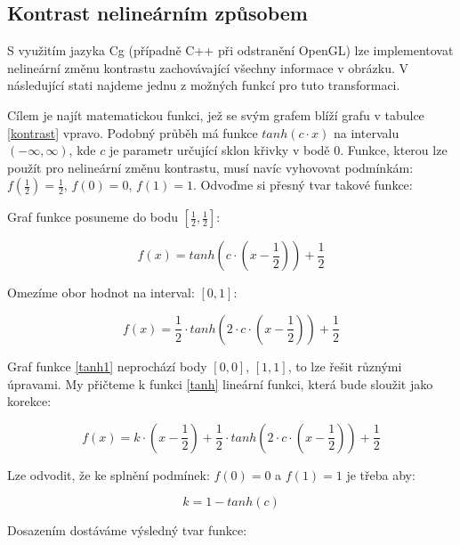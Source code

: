\subsection{Kontrast nelineárním způsobem}
S využitím jazyka Cg (případně C++ při odstranění OpenGL) lze implementovat nelineární změnu kontrastu zachovávající všechny informace v obrázku. V následující stati najdeme jednu z možných funkcí pro tuto transformaci.

Cílem je najít matematickou funkci, jež se svým grafem blíží grafu v tabulce \ref{kontrast} vpravo. Podobný průběh má funkce $tanh(c\cdot x)$ na intervalu $(-\infty,\infty)$, kde $c$ je parametr určující sklon křivky v bodě $0$. Funkce, kterou lze použít pro nelineární změnu kontrastu, musí navíc vyhovovat podmínkám: $f(\frac{1}{2})=\frac{1}{2}$, $f(0)=0$, $f(1)=1$. Odvoďme si přesný tvar takové funkce:

Graf funkce posuneme do bodu  $[\frac{1}{2},\frac{1}{2}]$:

\begin{equation}
f(x) = tanh(c\cdot(x-\frac{1}{2})) + \frac{1}{2}
\end{equation}

Omezíme obor hodnot na interval: $[0,1]$:

\begin{equation} \label{tanh1}
f(x) = \frac{1}{2}\cdot tanh(2\cdot c\cdot(x-\frac{1}{2})) + \frac{1}{2}
\end{equation}

Graf funkce \ref{tanh1} neprochází body $[0,0]$, $[1,1]$, to lze řešit různými úpravami. My přičteme k funkci \ref{tanh} lineární funkci, která bude sloužit jako korekce:

\begin{equation}
f(x) = k\cdot(x-\frac{1}{2}) + \frac{1}{2}\cdot tanh(2\cdot c\cdot(x-\frac{1}{2})) + \frac{1}{2}
\end{equation}

Lze odvodit, že ke splnění podmínek: $f(0)=0$ a $f(1)=1$ je třeba aby:

\begin{equation}
k = 1 - tanh(c)
\end{equation}

Dosazením dostáváme výsledný tvar funkce:

\begin{center}
\end{center}

